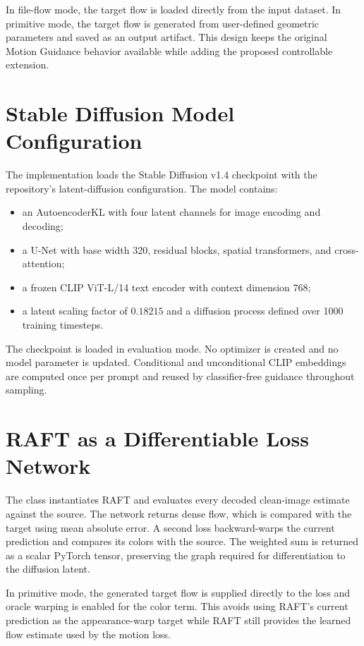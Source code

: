 In file-flow mode, the target flow is loaded directly from the input dataset. In primitive mode, the target flow is generated from user-defined geometric parameters and saved as an output artifact. This design keeps the original Motion Guidance behavior available while adding the proposed controllable extension.

\section{Stable Diffusion Model Configuration}

The implementation loads the Stable Diffusion v1.4 checkpoint with the repository's latent-diffusion configuration. The model contains:

\begin{itemize}
  \item an AutoencoderKL with four latent channels for image encoding and decoding;
  \item a U-Net with base width 320, residual blocks, spatial transformers, and cross-attention;
  \item a frozen CLIP ViT-L/14 text encoder with context dimension 768;
  \item a latent scaling factor of $0.18215$ and a diffusion process defined over 1000 training timesteps.
\end{itemize}

The checkpoint is loaded in evaluation mode. No optimizer is created and no model parameter is updated. Conditional and unconditional CLIP embeddings are computed once per prompt and reused by classifier-free guidance throughout sampling.

\section{RAFT as a Differentiable Loss Network}

The class  instantiates RAFT and evaluates every decoded clean-image estimate against the source. The network returns dense flow, which is compared with the target using mean absolute error. A second loss backward-warps the current prediction and compares its colors with the source. The weighted sum is returned as a scalar PyTorch tensor, preserving the graph required for differentiation to the diffusion latent.

In primitive mode, the generated target flow is supplied directly to the loss and oracle warping is enabled for the color term. This avoids using RAFT's current prediction as the appearance-warp target while RAFT still provides the learned flow estimate used by the motion loss.

